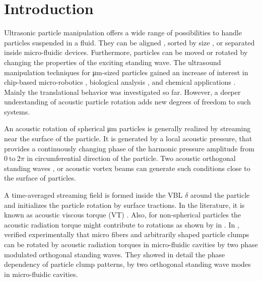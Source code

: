 \section{Introduction \label{sec:VT-introduction}}

Ultrasonic particle manipulation offers a wide range of possibilities to handle 
particles suspended in a fluid. They can be aligned 
\cite{Phan2014,Leibacher2015b,Leibacher2015a}, sorted by size 
\cite{Collins2014, Laurell2007}, or separated \cite{Petersson2004, 
Grenvall2009} inside micro-fluidic devices.  Furthermore, particles can be 
moved or rotated \cite{Schwarz2015, Lamprecht2015, Bernard2017b} by changing 
the properties of the exciting standing wave. The ultrasound manipulation 
techniques for \si{\micro\meter}-sized particles gained an increase of interest 
in chip-based micro-robotics \cite{Dual2012, Ahmed2016}, biological analysis 
\cite{Grenvall2009, Sitters2015}, and chemical applications \cite{Evander2012}.  
Mainly the translational behavior was investigated so far.  However, a deeper 
understanding of acoustic particle rotation adds new degrees of freedom to such 
systems.

An acoustic rotation of spherical \si{\micro\meter} particles is generally 
realized by streaming near the surface of the particle. It is generated by a 
local acoustic pressure, that provides a continuously changing phase of the 
harmonic pressure amplitude from $0~\text{to}~2\pi$ in circumferential direction 
of the particle. Two acoustic orthogonal standing waves \cite{Wang1989}, or acoustic 
vortex beams \cite{Marston2016} can generate such conditions close to 
the surface of particles. 

A time-averaged streaming field is formed inside the VBL 
$\delta$ around the particle and initializes the particle rotation by surface 
tractions.  In the literature, it is known as acoustic viscous torque (VT) 
\cite{Busse1981, Rudnick1977, Wang1989}. Also, for non-spherical particles the acoustic 
radiation torque might contribute to rotations as shown by \citeauthor{Maidanik1958} 
\cite{Maidanik1958} in \citeyear{Maidanik1958}. In \citeyear{Schwarz2015}, 
\citeauthor{Schwarz2015} \cite{Schwarz2015,Dual2012} verified experimentally that 
micro fibers and arbitrarily shaped particle clumps can be rotated by acoustic 
radiation torques in micro-fluidic cavities by two phase modulated orthogonal 
standing waves. They showed in detail the phase dependency of particle clump 
patterns, by two orthogonal standing wave modes in micro-fluidic cavities.

